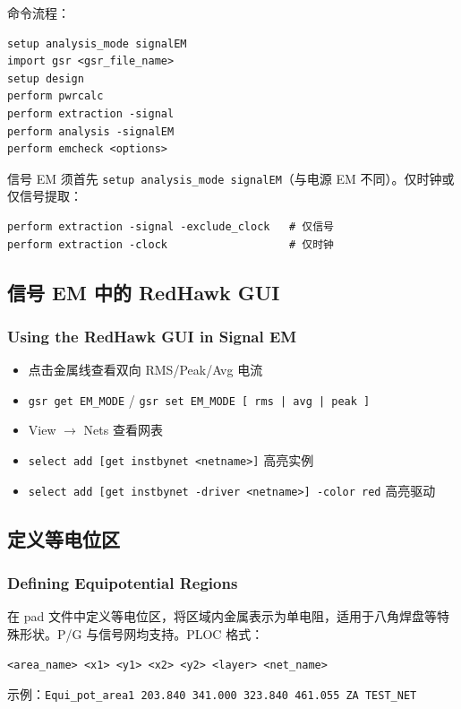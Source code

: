 命令流程：
\begin{lstlisting}
setup analysis_mode signalEM
import gsr <gsr_file_name>
setup design
perform pwrcalc
perform extraction -signal
perform analysis -signalEM
perform emcheck <options>
\end{lstlisting}

\begin{noteBox}
信号 EM 须首先 \texttt{setup analysis\_mode signalEM}（与电源 EM 不同）。仅时钟或仅信号提取：
\begin{lstlisting}
perform extraction -signal -exclude_clock   # 仅信号
perform extraction -clock                   # 仅时钟
\end{lstlisting}
\end{noteBox}

\subsection{信号 EM 中的 RedHawk GUI}
\subsubsection*{Using the RedHawk GUI in Signal EM}

\begin{itemize}
  \item 点击金属线查看双向 RMS/Peak/Avg 电流
  \item \texttt{gsr get EM\_MODE} / \texttt{gsr set EM\_MODE [ rms | avg | peak ]}
  \item View $\rightarrow$ Nets 查看网表
  \item \texttt{select add [get instbynet <netname>]} 高亮实例
  \item \texttt{select add [get instbynet -driver <netname>] -color red} 高亮驱动
\end{itemize}

\subsection{定义等电位区}
\subsubsection*{Defining Equipotential Regions}

在 pad 文件中定义等电位区，将区域内金属表示为单电阻，适用于八角焊盘等特殊形状。P/G 与信号网均支持。PLOC 格式：
\begin{lstlisting}
<area_name> <x1> <y1> <x2> <y2> <layer> <net_name>
\end{lstlisting}
示例：\texttt{Equi\_pot\_area1 203.840 341.000 323.840 461.055 ZA TEST\_NET}

